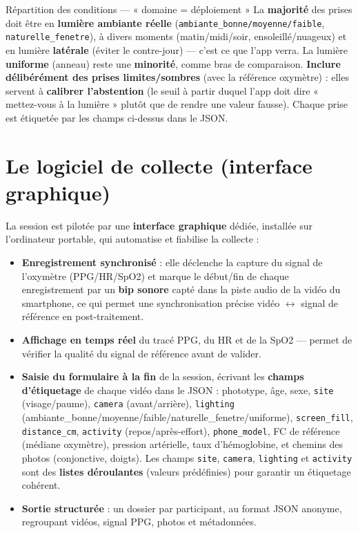 \documentclass[11pt,a4paper]{article}
\begin{document}
\begin{notebox}{Répartition des conditions --- « domaine = déploiement »}
La \textbf{majorité} des prises doit être en \textbf{lumière ambiante réelle}
(\texttt{ambiante\_bonne/moyenne/faible}, \texttt{naturelle\_fenetre}), à divers
moments (matin/midi/soir, ensoleillé/nuageux) et en lumière \textbf{latérale}
(éviter le contre-jour) --- c'est ce que l'app verra. La lumière \textbf{uniforme}
(anneau) reste une \textbf{minorité}, comme bras de comparaison. \textbf{Inclure
délibérément des prises limites/sombres} (avec la référence oxymètre) : elles
servent à \textbf{calibrer l'abstention} (le seuil à partir duquel l'app doit dire
« mettez-vous à la lumière » plutôt que de rendre une valeur fausse). Chaque prise
est étiquetée par les champs ci-dessus dans le JSON.
\end{notebox}

\section{Le logiciel de collecte (interface graphique)}
\label{sec:gui}

La session est pilotée par une \textbf{interface graphique} dédiée, installée sur
l'ordinateur portable, qui automatise et fiabilise la collecte :

\begin{itemize}
\item \textbf{Enregistrement synchronisé} : elle déclenche la capture du signal
de l'oxymètre (PPG/HR/SpO2) et marque le début/fin de chaque enregistrement par
un \textbf{bip sonore} capté dans la piste audio de la vidéo du smartphone, ce
qui permet une synchronisation précise vidéo $\leftrightarrow$ signal de
référence en post-traitement.
\item \textbf{Affichage en temps réel} du tracé PPG, du HR et de la SpO2 ---
permet de vérifier la qualité du signal de référence avant de valider.
\item \textbf{Saisie du formulaire à la fin} de la session, écrivant les
\textbf{champs d'étiquetage} de chaque vidéo dans le JSON : phototype, âge, sexe,
\texttt{site} (visage/paume), \texttt{camera} (avant/arrière), \texttt{lighting}
(ambiante\_bonne/moyenne/faible/naturelle\_fenetre/uniforme), \texttt{screen\_fill},
\texttt{distance\_cm}, \texttt{activity} (repos/après-effort), \texttt{phone\_model},
FC de référence (médiane oxymètre), pression artérielle, taux d'hémoglobine, et
chemins des photos (conjonctive, doigts). Les champs \texttt{site}, \texttt{camera},
\texttt{lighting} et \texttt{activity} sont des \textbf{listes déroulantes} (valeurs
prédéfinies) pour garantir un étiquetage cohérent.
\item \textbf{Sortie structurée} : un dossier par participant, au format JSON
anonyme, regroupant vidéos, signal PPG, photos et métadonnées.
\end{itemize}
\end{document}
